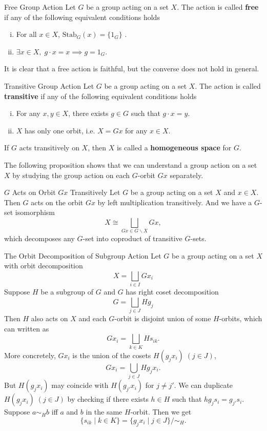 \begin{definition}{Free Group Action}{}
    Let $G$ be a group acting on a set $X$. The action is called \textbf{free} if any of the following equivalent conditions holds
    \begin{enumerate}[(i)]
        \item For all $x\in X$, $\mathrm{Stab}_G(x)=\{ 1_G\}$ .
        \item $\exists x\in X,\;g\cdot x=x\implies g=1_G$.
    \end{enumerate}
\end{definition}

It is clear that a free action is faithful, but the converse does not hold in general.

\begin{definition}{Transitive Group Action}{}
    Let $G$ be a group acting on a set $X$. The action is called \textbf{transitive} if any of the following equivalent conditions holds
    \begin{enumerate}[(i)]
        \item For any $x,y\in X$, there exists $g\in G$ such that $g\cdot x=y$.
        \item $X$ has only one orbit, i.e. $X= Gx$ for any $x\in X$.
    \end{enumerate}
    If $G$ acts transitively on $X$, then $X$ is called a \textbf{homogeneous space} for $G$.
\end{definition}

The following proposition shows that we can understand a group action on a set $X$ by studying the group action on each $G$-orbit $Gx$ separately.

\begin{proposition}{$G$ Acts on Orbit $Gx$ Transitively}{}
    Let $G$ be a group acting on a set $X$ and $x\in X$. Then $G$ acts on the orbit $Gx$ by left multiplication transitively. And we have a $G$-set isomorphism
    \[
        X\cong \bigsqcup_{Gx\in G\backslash X}Gx,
    \]
    which decomposes any $G$-set into coproduct of transitive $G$-sets.
\end{proposition}

\begin{example}{The Orbit Decomposition of Subgroup Action}{}
    Let $G$ be a group acting on a set $X$ with orbit decomposition
    \[
        X=\bigsqcup_{i \in I} G x_i
    \]
    Suppose $H$ be a subgroup of $G$ and $G$ has right coset decomposition
    \[
        G=\bigsqcup_{j \in J} Hg_j
    \]
    Then $H$ also acts on $X$ and each $G$-orbit is disjoint union of some $H$-orbits, which can written as
    \[
        Gx_i =\bigsqcup_{k \in K} H s_{ik}.
    \]
    More concretely, $Gx_i$ is the union of the cosets $H (g_jx_i)\;(j \in J)$,
    \[
        Gx_i =\bigcup_{j \in J} H g_j x_i.
    \]
    But $H (g_{j}x_i)$ may coincide with $H (g_{j'}x_i)$ for $j\ne j'$. We can duplicate $H (g_jx_i)\;(j \in J)$ by checking if there exists $h \in H$ such that $h g_j s_i=g_{j'} s_i$. Suppose $a \sim_H b$ iff $a$ and $b$ in the same $H$-orbit. Then we get
    \[
        \{s_{ik}\mid k \in K\}=\{g_j x_i \mid j \in J\}/\sim_H.
    \]
\end{example}

